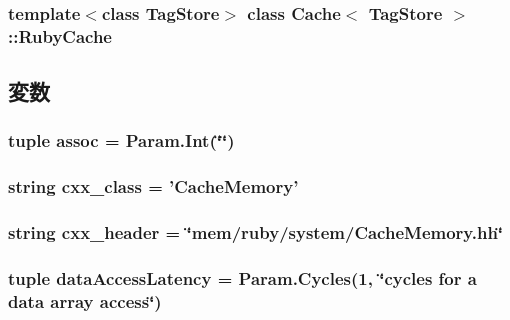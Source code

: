 \subsubsection*{template$<$class TagStore$>$ class Cache$<$ TagStore $>$::RubyCache}



\subsection{変数}
\hypertarget{classCache_1_1RubyCache_a19c16ab1fbe2e2d958dbfd7213149cfc}{
\subsubsection[{assoc}]{\setlength{\rightskip}{0pt plus 5cm}tuple {\bf assoc} = Param.Int(\char`\"{}\char`\"{})}}
\label{classCache_1_1RubyCache_a19c16ab1fbe2e2d958dbfd7213149cfc}
\hypertarget{classCache_1_1RubyCache_a58cd55cd4023648e138237cfc0822ae3}{
\subsubsection[{cxx\_\-class}]{\setlength{\rightskip}{0pt plus 5cm}string {\bf cxx\_\-class} = '{\bf CacheMemory}'}}
\label{classCache_1_1RubyCache_a58cd55cd4023648e138237cfc0822ae3}
\hypertarget{classCache_1_1RubyCache_a17da7064bc5c518791f0c891eff05fda}{
\subsubsection[{cxx\_\-header}]{\setlength{\rightskip}{0pt plus 5cm}string {\bf cxx\_\-header} = \char`\"{}mem/ruby/{\bf system}/CacheMemory.hh\char`\"{}}}
\label{classCache_1_1RubyCache_a17da7064bc5c518791f0c891eff05fda}
\hypertarget{classCache_1_1RubyCache_aff29edacbeb0dfe8d5191cbde1450be2}{
\subsubsection[{dataAccessLatency}]{\setlength{\rightskip}{0pt plus 5cm}tuple {\bf dataAccessLatency} = Param.Cycles(1, \char`\"{}cycles for a data array access\char`\"{})}}
